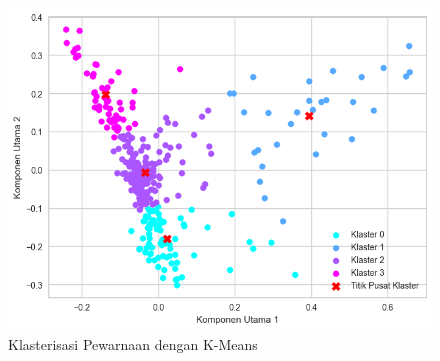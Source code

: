 \begin{figure}[H]
    \centering
    \includegraphics[width=0.7\linewidth]{img/4-222.png}
    \caption{Klasterisasi Pewarnaan dengan K-Means}
    \label{fig:4-222}
\end{figure}




